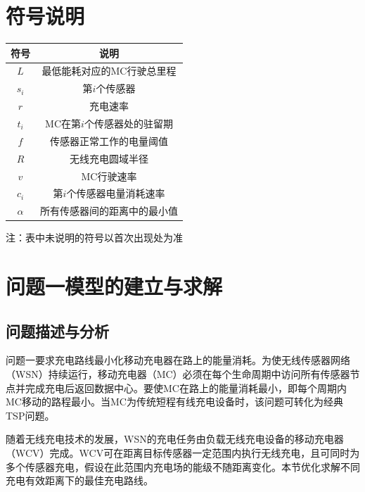 \documentclass{whutmod}
\begin{document}
    \section{符号说明}
        \begin{table}[H]
            \centering
            \setlength{\tabcolsep}{12mm}
            \begin{tabular}{cc}
                \toprule[1.5pt]
                \multicolumn{1}{m{5cm}}{\centering 符号} & \multicolumn{1}{m{5cm}}{\centering 说明} \\
                \midrule[1pt]
                $L$ & 最低能耗对应的MC行驶总里程 \\
                $s_i$ & 第$i$个传感器 \\
                $r$ & 充电速率 \\
                $t_i$ & MC在第$i$个传感器处的驻留期 \\
                $f$ & 传感器正常工作的电量阈值 \\
                $R$ & 无线充电圆域半径 \\
                $v$ & MC行驶速率 \\
                $c_i$ & 第$i$个传感器电量消耗速率 \\
                $\alpha$ & 所有传感器间的距离中的最小值 \\
                \bottomrule[1.5pt]
            \end{tabular}
            \begin{tablenotes}
                \item 注：表中未说明的符号以首次出现处为准
            \end{tablenotes}
        \end{table}

    \section{问题一模型的建立与求解}
        \subsection{问题描述与分析}
            问题一要求充电路线最小化移动充电器在路上的能量消耗。为使无线传感器网络（WSN）持续运行，移动充电器（MC）必须在每个生命周期中访问所有传感器节点并完成充电后返回数据中心。要使MC在路上的能量消耗最小，即每个周期内MC移动的路程最小。当MC为传统短程有线充电设备时，该问题可转化为经典TSP问题。

            随着无线充电技术的发展，WSN的充电任务由负载无线充电设备的移动充电器（WCV）完成。WCV可在距离目标传感器一定范围内执行无线充电，且可同时为多个传感器充电，假设在此范围内充电场的能级不随距离变化。本节优化求解不同充电有效距离下的最佳充电路线。
\end{document}
